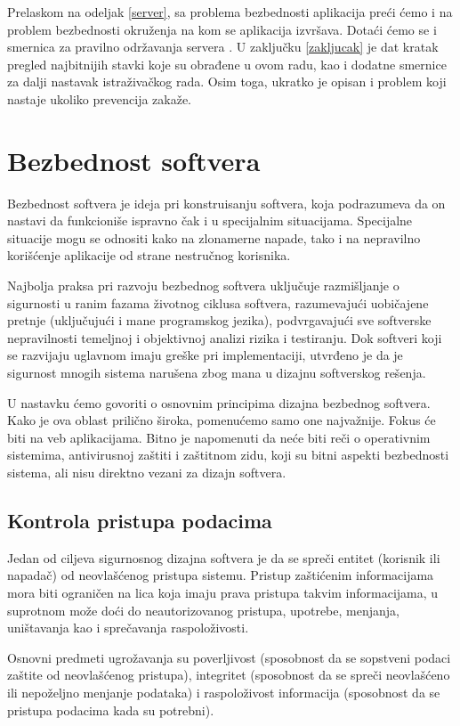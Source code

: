 \documentclass[a4paper]{article}
\begin{document}
Prelaskom na odeljak \ref{server}, sa problema bezbednosti aplikacija preći ćemo i na problem bezbednosti okruženja na kom se aplikacija izvršava. Dotaći ćemo se i smernica za pravilno održavanja servera \cite{WS}. U zaklju\v{c}ku \ref{zakljucak} je dat kratak pregled najbitnijih stavki koje su obrađene u ovom radu, kao i dodatne smernice za dalji nastavak istraživačkog rada. Osim toga, ukratko je opisan i problem koji nastaje ukoliko prevencija zakaže.

\section{Bezbednost softvera} \label{bezbednost}

Bezbednost softvera je ideja pri konstruisanju softvera, koja podrazumeva da on nastavi da funkcioniše ispravno čak i u specijalnim situacijama. Specijalne situacije mogu se odnositi kako na zlonamerne napade, tako i na nepravilno korišćenje aplikacije od strane nestručnog korisnika.

Najbolja praksa pri razvoju bezbednog softvera uključuje razmišljanje o sigurnosti u ranim fazama životnog ciklusa softvera, razumevajući uobičajene pretnje (uključujući i mane programskog jezika), podvrgavajući sve softverske nepravilnosti temeljnoj i objektivnoj analizi rizika i testiranju. Dok softveri koji se razvijaju uglavnom imaju greške pri implementaciji, utvrđeno je da je sigurnost mnogih sistema narušena zbog mana u dizajnu softverskog rešenja.

U nastavku ćemo govoriti o osnovnim principima dizajna bezbednog softvera. Kako je ova oblast prilično široka, pomenućemo samo one najvažnije. Fokus će biti na veb aplikacijama. Bitno je napomenuti da neće biti reči o operativnim sistemima, antivirusnoj zaštiti i zaštitnom zidu, koji su bitni aspekti bezbednosti sistema, ali nisu direktno vezani za dizajn softvera.

\subsection{Kontrola pristupa podacima}
Jedan od ciljeva sigurnosnog dizajna softvera je da se spreči entitet (korisnik ili napadač) od neovlašćenog pristupa sistemu. Pristup zaštićenim informacijama mora biti ograničen na lica koja imaju prava pristupa takvim informacijama, u suprotnom može doći do neautorizovanog pristupa, upotrebe, menjanja, uništavanja kao i sprečavanja raspoloživosti.

Osnovni predmeti ugrožavanja su poverljivost (sposobnost da se sopstveni podaci zaštite od neovlašćenog pristupa), integritet (sposobnost da se spreči neovlašćeno ili nepoželjno menjanje podataka) i raspoloživost informacija (sposobnost da se pristupa podacima kada su potrebni).\cite{BIS}
\end{document}
